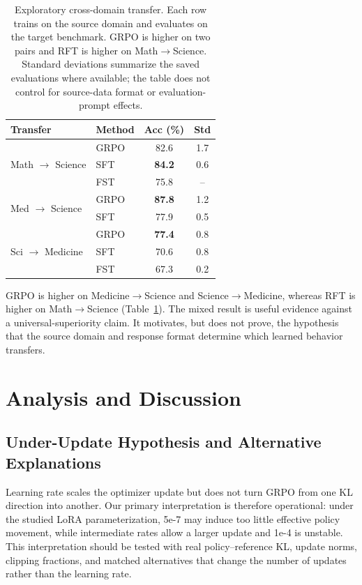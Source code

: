 \documentclass[11pt]{article}
\begin{document}
\begin{table}[t]
\centering
\small
\begin{tabular}{@{}llcc@{}}
\toprule
\textbf{Transfer} & \textbf{Method} & \textbf{Acc (\%)} & \textbf{Std} \\
\midrule
\multirow{3}{*}{Math $\to$ Science} & GRPO & 82.6 & 1.7 \\
 & SFT & \textbf{84.2} & 0.6 \\
 & FST & 75.8 & -- \\
\midrule
\multirow{2}{*}{Med $\to$ Science} & GRPO & \textbf{87.8} & 1.2 \\
 & SFT & 77.9 & 0.5 \\
\midrule
\multirow{3}{*}{Sci $\to$ Medicine} & GRPO & \textbf{77.4} & 0.8 \\
 & SFT & 70.6 & 0.8 \\
 & FST & 67.3 & 0.2 \\
\bottomrule
\end{tabular}
\caption{Exploratory cross-domain transfer. Each row trains on the source domain and evaluates on the target benchmark. GRPO is higher on two pairs and RFT is higher on Math$\to$Science. Standard deviations summarize the saved evaluations where available; the table does not control for source-data format or evaluation-prompt effects.}
\label{tab:cross_domain}
\end{table}

GRPO is higher on Medicine$\to$Science and Science$\to$Medicine, whereas RFT is higher on Math$\to$Science (Table~\ref{tab:cross_domain}). The mixed result is useful evidence against a universal-superiority claim. It motivates, but does not prove, the hypothesis that the source domain and response format determine which learned behavior transfers.

\section{Analysis and Discussion}

\subsection{Under-Update Hypothesis and Alternative Explanations}

Learning rate scales the optimizer update but does not turn GRPO from one KL direction into another. Our primary interpretation is therefore operational: under the studied LoRA parameterization, 5e-7 may induce too little effective policy movement, while intermediate rates allow a larger update and 1e-4 is unstable. This interpretation should be tested with real policy--reference KL, update norms, clipping fractions, and matched alternatives that change the number of updates rather than the learning rate.
\end{document}
